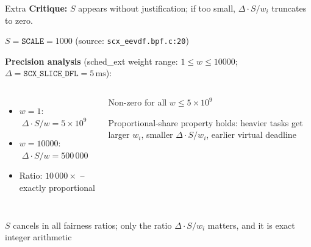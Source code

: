 \documentclass[aspectratio=169]{beamer}
\begin{document}
\begin{frame}{Extra}
      \textbf{Critique:} $S$ appears without justification;
        if too small, $\Delta \cdot S / w_i$ truncates to zero.

        \vspace{0.3cm}
        $S = \texttt{SCALE} = 1000$ (source: \texttt{scx\_eevdf.bpf.c:20})

        \vspace{0.3cm}
        \textbf{Precision analysis} (sched\_ext weight range: $1 \le w \le 10000$;
        $\Delta = \texttt{SCX\_SLICE\_DFL} = 5\,\text{ms}$):

        \vspace{0.15cm}
        \begin{columns}
                \begin{itemize}
                        \item $w = 1$: $\;\Delta \cdot S / w = 5 \times 10^9$
                        \item $w = 10000$: $\;\Delta \cdot S / w = 500\,000$
                        \item Ratio: $10\,000\times$ -- exactly proportional
                \end{itemize}

                \begin{shadowbox}
                        \footnotesize{
                                Non-zero for all $w \le 5 \times 10^9$
                                
                                \vspace{0.1cm}
                                Proportional-share property holds:
                                heavier tasks get larger $w_i$,
                                smaller $\Delta \cdot S / w_i$,
                                earlier virtual deadline
                        }
                \end{shadowbox}
        \end{columns}

        \vspace{0.2cm}
        \footnotesize{$S$ cancels in all fairness ratios; only the
        ratio $\Delta \cdot S / w_i$ matters, and it is exact integer arithmetic}
\end{frame}
\addtocounter{framenumber}{-1}
\end{document}
